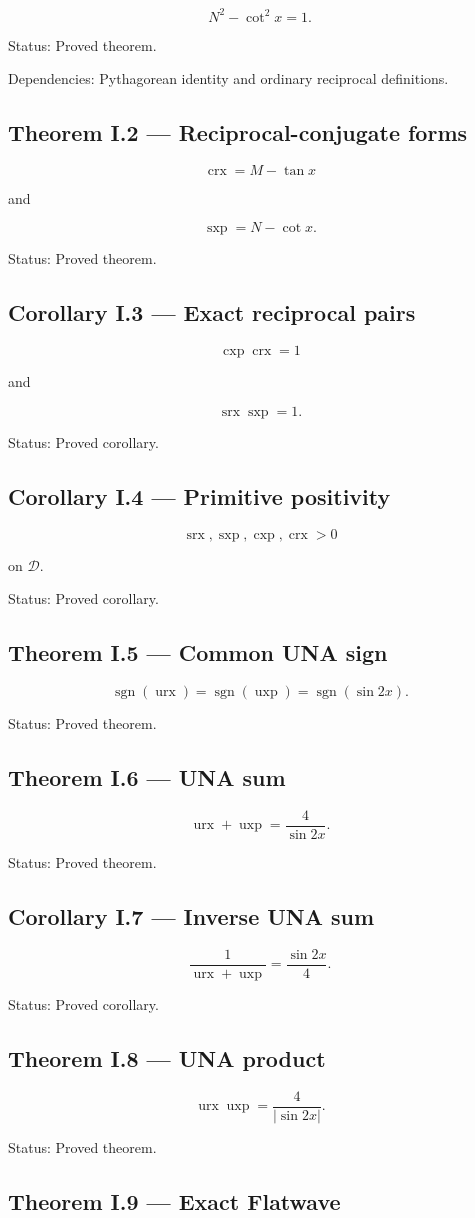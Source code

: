 \documentclass[11pt,oneside,openany]{book}
\newcommand{\PCsubsection}[1]{%
  \subsection*{#1}%
}
\begin{document}
\[
\boxed{ N^2-\cot^2x=1. }
\]

Status: Proved theorem.

Dependencies: Pythagorean identity and ordinary reciprocal definitions.

\PCsubsection{Theorem I.2 --- Reciprocal-conjugate forms}

\[
\boxed{ \operatorname{crx} = M-\tan x }
\]

and

\[
\boxed{ \operatorname{sxp} = N-\cot x. }
\]

Status: Proved theorem.

\PCsubsection{Corollary I.3 --- Exact reciprocal pairs}

\[
\boxed{ \operatorname{cxp}\operatorname{crx}=1 }
\]

and

\[
\boxed{ \operatorname{srx}\operatorname{sxp}=1. }
\]

Status: Proved corollary.

\PCsubsection{Corollary I.4 --- Primitive positivity}

\[
\boxed{ \operatorname{srx}, \operatorname{sxp}, \operatorname{cxp}, \operatorname{crx}>0 }
\]

on \(\mathcal D\).

Status: Proved corollary.

\PCsubsection{Theorem I.5 --- Common UNA sign}

\[
\boxed{ \operatorname{sgn}(\operatorname{urx}) = \operatorname{sgn}(\operatorname{uxp}) = \operatorname{sgn}(\sin 2x) }.
\]


Status: Proved theorem.

\PCsubsection{Theorem I.6 --- UNA sum}

\[
\boxed{ \operatorname{urx} + \operatorname{uxp} = \frac4{\sin 2x}. }
\]

Status: Proved theorem.

\PCsubsection{Corollary I.7 --- Inverse UNA sum}

\[
\boxed{ \frac1{\operatorname{urx}+\operatorname{uxp}} = \frac{\sin 2x}{4}. }
\]

Status: Proved corollary.

\PCsubsection{Theorem I.8 --- UNA product}

\[
\boxed{ \operatorname{urx}\operatorname{uxp} = \frac4{|\sin 2x|}. }
\]

Status: Proved theorem.

\PCsubsection{Theorem I.9 --- Exact Flatwave}
\end{document}
